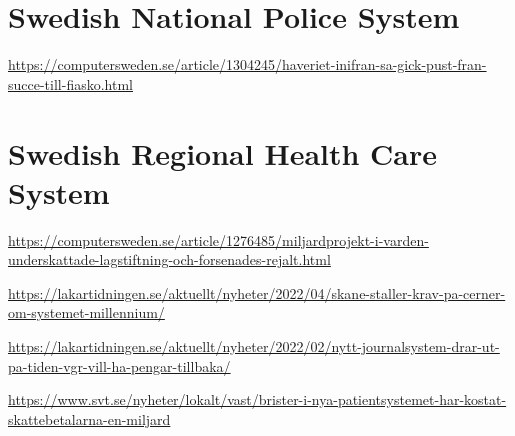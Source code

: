 \documentclass{reqengbook}
\begin{document}
\section{Swedish National Police System}

\url{https://computersweden.se/article/1304245/haveriet-inifran-sa-gick-pust-fran-succe-till-fiasko.html}

\section{Swedish Regional Health Care System}

\url{https://computersweden.se/article/1276485/miljardprojekt-i-varden-underskattade-lagstiftning-och-forsenades-rejalt.html}

\url{https://lakartidningen.se/aktuellt/nyheter/2022/04/skane-staller-krav-pa-cerner-om-systemet-millennium/}

\url{https://lakartidningen.se/aktuellt/nyheter/2022/02/nytt-journalsystem-drar-ut-pa-tiden-vgr-vill-ha-pengar-tillbaka/}

\url{https://www.svt.se/nyheter/lokalt/vast/brister-i-nya-patientsystemet-har-kostat-skattebetalarna-en-miljard}
\end{document}
